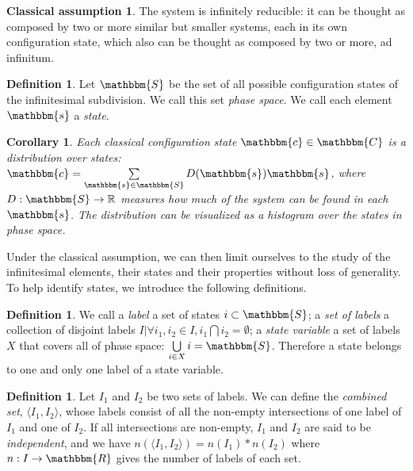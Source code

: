 \documentclass[aps,pra,10pt,twocolumn,floatfix,nofootinbib]{revtex4-1}
\newtheorem{cor}[thm]{Corollary}
\theoremstyle{definition}
\newtheorem{defn}[thm]{Definition}
\newtheorem*{assump1}{Classical assumption}
\begin{document}
\begin{assump1}\label{classical}
The system is infinitely reducible: it can be thought as composed by two or more similar but smaller systems, each in its own configuration state, which also can be thought as composed by two or more, ad infinitum.
\end{assump1}

\begin{defn}\label{classicalPhaseSpace}
Let $\mathbbm{S}$ be the set of all possible configuration states of the infinitesimal subdivision. We call this set \emph{phase space}. We call each element $\mathbbm{s}$ a \emph{state}.
\end{defn}

\begin{cor}\label{classicalDistribution}
Each classical configuration state $\mathbbm{c} \in \mathbbm{C}$ is a distribution over states: $\mathbbm{c}=\sum\limits_{\mathbbm{s} \in \mathbbm{S}} D(\mathbbm{s}) \mathbbm{s}$, where $D:\mathbbm{S}\rightarrow\mathbb{R}$ measures how much of the system can be found in each $\mathbbm{s}$. The distribution can be visualized as a histogram over the states in phase space.
\end{cor}

Under the classical assumption, we can then limit ourselves to the study of the infinitesimal elements, their states and their properties without loss of generality. To help identify states, we introduce the following definitions.

\begin{defn}\label{label}
We call a \emph{label} a set of states $i\subset\mathbbm{S}$; a \emph{set of labels} a collection of disjoint labels $I | \forall i_1,i_2\in I, i_1\bigcap i_2 = \emptyset$; a \emph{state variable} a set of labels $X$ that covers all of phase space: $\bigcup\limits_{i \in X}i=\mathbbm{S}$. Therefore a state belongs to one and only one label of a state variable.
\end{defn}

\begin{defn}\label{labelsCombine}
Let $I_1$ and $I_2$ be two sets of labels. We can define the \emph{combined set}, $\langle I_1, I_2 \rangle$, whose labels consist of all the non-empty intersections of one label of $I_1$ and one of $I_2$. If all intersections are non-empty, $I_1$ and $I_2$ are said to be \emph{independent}, and we have $n(\langle I_1, I_2 \rangle)=n(I_1)*n(I_2)$ where $n: I \rightarrow \mathbbm{R}$ gives the number of labels of each set.
\end{defn}
\end{document}
